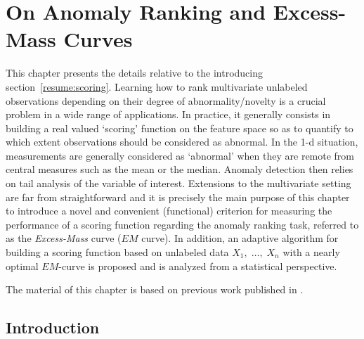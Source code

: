 \chapter{On Anomaly Ranking and Excess-Mass Curves}
\label{aistat:chap}
\begin{chapabstract}
This chapter presents the details relative to the introducing section~\ref{resume:scoring}.
Learning how to rank multivariate unlabeled observations depending on their degree of abnormality/novelty is a crucial problem in a wide range of applications. In practice, it generally consists in building a real valued `scoring' function on the feature space
so as to quantify to which extent observations should be considered as abnormal.
 In the 1-d situation, measurements are generally considered as `abnormal' when they are remote from central measures such as the mean or the median. Anomaly detection then relies on tail
analysis of the variable of interest. Extensions to the multivariate setting are far from straightforward and it is precisely the main purpose of this chapter to introduce a novel and convenient (functional) criterion for measuring the performance of a scoring function regarding the anomaly ranking task, referred to as the \textit{Excess-Mass} curve ($EM$
curve). In addition, an adaptive algorithm for building a scoring function based on unlabeled data $X_1,\; \ldots,\; X_n$ with a nearly optimal $EM$-curve is proposed and is analyzed from a statistical perspective.

The material of this chapter is based on previous work published in \cite{AISTAT15}.
\end{chapabstract}



\section{Introduction}

